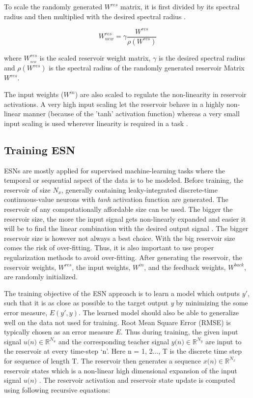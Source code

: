 To scale the randomly generated $W^{res}$ matrix, it is first divided by its spectral radius and then multiplied with the desired spectral radius \cite{esn:jaeger_tutorial}.

\begin{equation}\label{eqn:res_scaling}
W_{new}^{{res}}=\gamma \frac{W^{res}}{\rho(W^{res})}
\end{equation}

where $W_{_{new}}^{{res}}$ is the scaled reservoir weight matrix, $ \gamma$ is the desired spectral radius and $\rho(W^{res})$ is the spectral radius of the randomly generated reservoir Matrix $W^{res}$.

The input weights ($W^{in}$) are also scaled to regulate the non-linearity in reservoir activations. A very high input scaling let the reservoir behave in a highly non-linear manner (because of the 'tanh' activation function) whereas a very small input scaling is used wherever linearity is required in a task \cite{esn:practical_guide}.

\subsection{Training ESN}\label{ssec:esn_training}

ESNs are mostly applied for supervised machine-learning tasks where the temporal or sequential aspect of the data is to be modeled. Before training, the reservoir of size $N_{x}$, generally containing leaky-integrated discrete-time continuous-value neurons with \textit{tanh} activation function are generated. The reservoir of any computationally affordable size can be used. The bigger the reservoir size, the more the input signal gets non-linearly expanded and easier it will be to find the linear combination with the desired output signal \cite{esn:practical_guide, esn:jaeger_tutorial}. The bigger reservoir size is however not always a best choice. With the big reservoir size comes the risk of over-fitting. Thus, it is also important to use proper regularization methods to avoid over-fitting. After generating the reservoir, the reservoir weights, $W^{res}$, the input weights, $W^{in}$, and the feedback weights, $W^{back}$, are randomly initialized.

The training objective of the ESN approach is to learn a model which outputs \textit{$y'$}, such that it is as close as possible to the target output \textit{y} by minimizing the some error measure, $E(y',y)$. The learned model should also be able to generalize well on the data not used for training. Root Mean Square Error (RMSE) is typically chosen as an error measure $E$. Thus during training, the given input signal $\textit{u(n)} \in \mathbb{R}^{N_u}$ and the corresponding teacher signal $\textit{y(n)} \in \mathbb{R}^{N_y}$  are input to the reservoir at every time-step `n'. Here n = 1, 2..., T is the discrete time step for sequence of length T. The reservoir then generates a sequence $\textit{x(n)} \in \mathbb{R}^{N_{x}}$ reservoir states which is a non-linear high dimensional expansion of the input signal $\textit{u(n)}$ \cite{esn:jaeger_tutorial}. The reservoir activation and reservoir state update is computed using following recursive equations:

